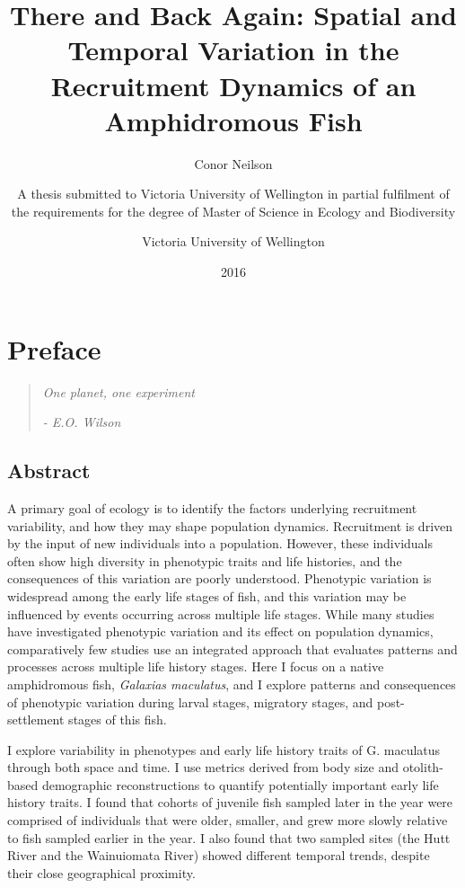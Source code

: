 \documentclass[]{book}
\title{There and Back Again: Spatial and Temporal Variation in the Recruitment
Dynamics of an Amphidromous Fish}
\subtitle{Conor Neilson}
\author{A thesis submitted to Victoria University of Wellington in partial
fulfilment of the requirements for the degree of Master of Science in
Ecology and Biodiversity \and Victoria University of Wellington}
\date{2016}
\begin{document}
\maketitle

{
\setcounter{tocdepth}{1}
\tableofcontents
}
\chapter{Preface}\label{intro}

\begin{quote}
\emph{One planet, one experiment}

\emph{- E.O. Wilson}
\end{quote}

\section{Abstract}\label{abstract}

A primary goal of ecology is to identify the factors underlying
recruitment variability, and how they may shape population dynamics.
Recruitment is driven by the input of new individuals into a population.
However, these individuals often show high diversity in phenotypic
traits and life histories, and the consequences of this variation are
poorly understood. Phenotypic variation is widespread among the early
life stages of fish, and this variation may be influenced by events
occurring across multiple life stages. While many studies have
investigated phenotypic variation and its effect on population dynamics,
comparatively few studies use an integrated approach that evaluates
patterns and processes across multiple life history stages. Here I focus
on a native amphidromous fish, \emph{Galaxias maculatus}, and I explore
patterns and consequences of phenotypic variation during larval stages,
migratory stages, and post-settlement stages of this fish.

I explore variability in phenotypes and early life history traits of G.
maculatus through both space and time. I use metrics derived from body
size and otolith-based demographic reconstructions to quantify
potentially important early life history traits. I found that cohorts of
juvenile fish sampled later in the year were comprised of individuals
that were older, smaller, and grew more slowly relative to fish sampled
earlier in the year. I also found that two sampled sites (the Hutt River
and the Wainuiomata River) showed different temporal trends, despite
their close geographical proximity.
\end{document}
